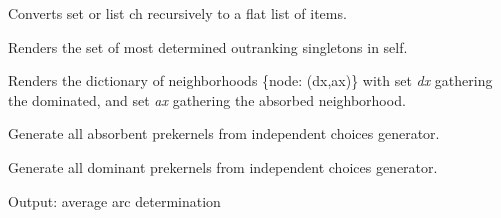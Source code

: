\documentclass[letterpaper,10pt,english]{sphinxmanual}
\begin{document}
\begin{fulllineitems}
\begin{fulllineitems}
\label{techDoc:digraphs.Digraph.flatChoice}
Converts set or list ch recursively to a flat list of items.

\end{fulllineitems}


\begin{fulllineitems}
\label{techDoc:digraphs.Digraph.forcedBestSingleChoice}
Renders the set of most determined outranking singletons in self.

\end{fulllineitems}


\begin{fulllineitems}
\label{techDoc:digraphs.Digraph.gammaSets}
Renders the dictionary of neighborhoods \{node: (dx,ax)\}
with set \emph{dx} gathering the dominated, and set \emph{ax} gathering
the absorbed neighborhood.

\end{fulllineitems}


\begin{fulllineitems}
\label{techDoc:digraphs.Digraph.generateAbsPreKernels}
Generate all absorbent prekernels from independent choices generator.

\end{fulllineitems}


\begin{fulllineitems}
\label{techDoc:digraphs.Digraph.generateDomPreKernels}
Generate all dominant prekernels from independent choices generator.

\end{fulllineitems}


\begin{fulllineitems}
\label{techDoc:digraphs.Digraph.graphDetermination}
Output: average arc determination


\end{fulllineitems}
\end{fulllineitems}
\end{document}
